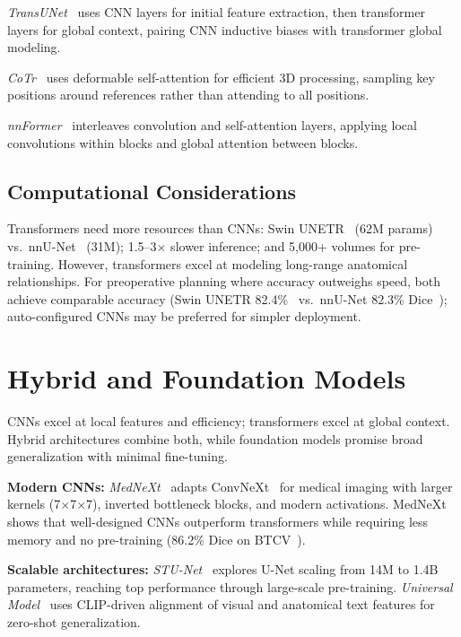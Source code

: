 \documentclass[conference]{IEEEtran}
\begin{document}
\emph{TransUNet}~\cite{chen2024transunet} uses CNN layers for initial feature extraction, then transformer layers for global context, pairing CNN inductive biases with transformer global modeling.

\emph{CoTr}~\cite{xie2021cotr} uses deformable self-attention for efficient 3D processing, sampling key positions around references rather than attending to all positions.

\emph{nnFormer}~\cite{zhou2021nnformer} interleaves convolution and self-attention layers, applying local convolutions within blocks and global attention between blocks.

\subsection{Computational Considerations}

Transformers need more resources than CNNs: Swin UNETR~\cite{swinunetr2022} (62M params) vs.\ nnU-Net~\cite{isensee2021nnunet} (31M); 1.5--3$\times$ slower inference; and 5,000+ volumes for pre-training. However, transformers excel at modeling long-range anatomical relationships. For preoperative planning where accuracy outweighs speed, both achieve comparable accuracy (Swin UNETR 82.4\%~\cite{swinunetr2022} vs.\ nnU-Net 82.3\% Dice~\cite{isensee2021nnunet}); auto-configured CNNs may be preferred for simpler deployment.

\section{Hybrid and Foundation Models}
\label{sec:hybrid}

CNNs excel at local features and efficiency; transformers excel at global context. Hybrid architectures combine both, while foundation models promise broad generalization with minimal fine-tuning.

\textbf{Modern CNNs:} \emph{MedNeXt}~\cite{roy2023mednext} adapts ConvNeXt~\cite{liu2022convnext} for medical imaging with larger kernels (7$\times$7$\times$7), inverted bottleneck blocks, and modern activations. MedNeXt shows that well-designed CNNs outperform transformers while requiring less memory and no pre-training (86.2\% Dice on BTCV~\cite{roy2023mednext}).

\textbf{Scalable architectures:} \emph{STU-Net}~\cite{huang2023stunet} explores U-Net scaling from 14M to 1.4B parameters, reaching top performance through large-scale pre-training. \emph{Universal Model}~\cite{liu2023universal} uses CLIP-driven alignment of visual and anatomical text features for zero-shot generalization.
\end{document}
